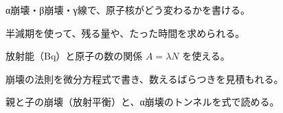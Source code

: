 \begin{furikaeri}
\begin{checklist}
\item α崩壊・β崩壊・γ線で、原子核がどう変わるかを書ける。
\item 半減期を使って、残る量や、たった時間を求められる。
\item 放射能（Bq）と原子の数の関係 $A=\lambda N$ を使える。
\item 崩壊の法則を微分方程式で書き、数えるばらつきを見積もれる。
\item 親と子の崩壊（放射平衡）と、α崩壊のトンネルを式で読める。
\end{checklist}
\end{furikaeri}
